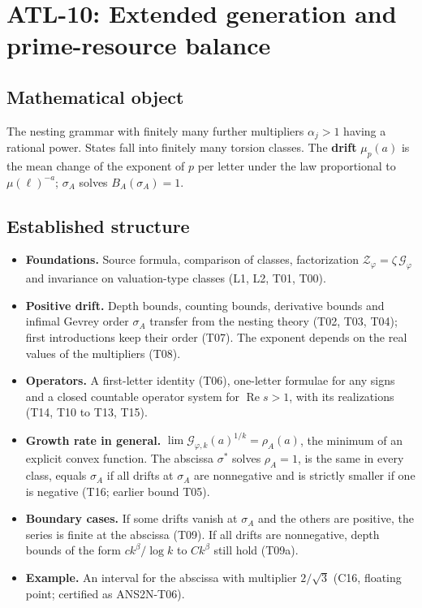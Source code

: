 \documentclass[
  11pt,
]{article}
\providecommand{\tightlist}{%
  \setlength{\itemsep}{0pt}\setlength{\parskip}{0pt}}
\begin{document}
\hypertarget{atl-10-extended-generation-and-prime-resource-balance}{%
\section{ATL-10: Extended generation and prime-resource
balance}\label{atl-10-extended-generation-and-prime-resource-balance}}

\hypertarget{mathematical-object-9}{%
\subsection{Mathematical object}\label{mathematical-object-9}}

The nesting grammar with finitely many further multipliers
\(\alpha_j>1\) having a rational power. States fall into finitely many
torsion classes. The \textbf{drift} \(\mu_p(a)\) is the mean change of
the exponent of \(p\) per letter under the law proportional to
\(\mu(\ell)^{-a}\); \(\sigma_A\) solves \(B_A(\sigma_A)=1\).

\hypertarget{established-structure-8}{%
\subsection{Established structure}\label{established-structure-8}}

\begin{itemize}
\tightlist
\item
  \textbf{Foundations.} Source formula, comparison of classes,
  factorization \(\mathcal Z_\varphi=\zeta\,\mathcal G_\varphi\) and
  invariance on valuation-type classes (L1, L2, T01, T00).
\item
  \textbf{Positive drift.} Depth bounds, counting bounds, derivative
  bounds and infimal Gevrey order \(\sigma_A\) transfer from the nesting
  theory (T02, T03, T04); first introductions keep their order (T07).
  The exponent depends on the real values of the multipliers (T08).
\item
  \textbf{Operators.} A first-letter identity (T06), one-letter formulae
  for any signs and a closed countable operator system for
  \(\operatorname{Re}s>1\), with its realizations (T14, T10 to T13,
  T15).
\item
  \textbf{Growth rate in general.}
  \(\lim\mathcal G_{\varphi,k}(a)^{1/k}=\rho_A(a)\), the minimum of an
  explicit convex function. The abscissa \(\sigma^\ast\) solves
  \(\rho_A=1\), is the same in every class, equals \(\sigma_A\) if all
  drifts at \(\sigma_A\) are nonnegative and is strictly smaller if one
  is negative (T16; earlier bound T05).
\item
  \textbf{Boundary cases.} If some drifts vanish at \(\sigma_A\) and the
  others are positive, the series is finite at the abscissa (T09). If
  all drifts are nonnegative, depth bounds of the form
  \(ck^{\beta}/\log k\) to \(Ck^{\beta}\) still hold (T09a).
\item
  \textbf{Example.} An interval for the abscissa with multiplier
  \(2/\sqrt3\) (C16, floating point; certified as ANS2N-T06).
\end{itemize}
\end{document}

